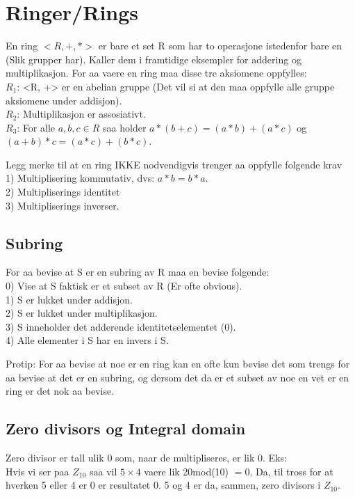 \documentclass[12pt,a4paper]{article}
\begin{document}
\section*{Ringer/Rings}
En ring $< R, +, * >$ er bare et set R som har to operasjone istedenfor bare en (Slik grupper har). Kaller dem i framtidige eksempler for addering og multiplikasjon. For aa vaere en ring maa disse tre aksiomene oppfylles:\\
$R_1$: <R, +> er en abelian gruppe (Det vil si at den maa oppfylle alle gruppe aksiomene under addisjon).\\
$R_2$: Multiplikasjon er assosiativt.\\
$R_3$: For alle $a,b,c \in R$ saa holder $a*(b+c) = (a*b) + (a*c)$ og $(a+b) * c = (a*c) + (b*c)$.

Legg merke til at en ring IKKE nodvendigvis trenger aa oppfylle folgende krav\\
1) Multiplisering kommutativ, dvs: $a*b = b*a$.\\
2) Multipliserings identitet\\
3) Multipliserings inverser.\\

\subsection*{Subring}
For aa bevise at S er en subring av R maa en bevise folgende:\\
0) Vise at S faktisk er et subset av R (Er ofte obvious).\\
1) S er lukket under addisjon.\\
2) S er lukket under multiplikasjon.\\
3) S inneholder det adderende identitetselementet (0).\\
4) Alle elementer i S har en invers i S.

Protip: For aa bevise at noe er en ring kan en ofte kun bevise det som trengs for aa bevise at det er en subring, og dersom det da er et subset av noe en vet er en ring er det nok aa bevise.

\subsection*{Zero divisors og Integral domain}
Zero divisor er tall ulik 0 som, naar de multipliseres, er lik 0. Eks:\\
Hvis vi ser paa $Z_{10}$ saa vil $5 \times 4$ vaere lik 20mod(10) $= 0$. Da, til tross for at hverken 5 eller 4 er 0 er resultatet 0. 5 og 4 er da, sammen, zero divisors i $Z_{10}$. \\
\end{document}
